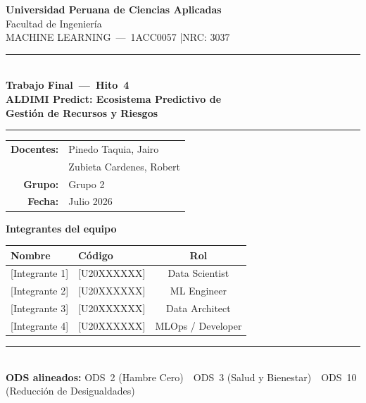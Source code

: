 \documentclass[12pt, a4paper]{article}
\begin{document}

\thispagestyle{empty}
\begin{center}
  \vspace*{1.2cm}
  {\LARGE\bfseries\color{primario} Universidad Peruana de Ciencias Aplicadas}\\[5pt]
  {\large\color{grismed} Facultad de Ingenier\'ia}\\[4pt]
  {\normalsize\color{grismed} MACHINE LEARNING\ ---\ 1ACC0057 \quad|\quad NRC: 3037}

  \vspace{0.8cm}
  \textcolor{primario}{\rule{\linewidth}{2.5pt}}\\[0.5cm]
  {\LARGE\bfseries\color{primario} Trabajo Final\ ---\ Hito~4}\\[0.4cm]
  {\large\bfseries\color{gristexto}
    ALDIMI Predict: Ecosistema Predictivo de\\[3pt]
    Gesti\'on de Recursos y Riesgos}\\[0.5cm]
  \textcolor{primario}{\rule{\linewidth}{2.5pt}}

  \vspace{1cm}
  \begin{tabular}{rl}
    \textbf{Docentes:} & Pinedo Taquia, Jairo \\[3pt]
                       & Zubieta Cardenes, Robert \\[8pt]
    \textbf{Grupo:}    & Grupo 2 \\[6pt]
    \textbf{Fecha:}    & Julio 2026 \\
  \end{tabular}

  \vspace{1.2cm}
  {\large\bfseries\color{primario} Integrantes del equipo}\\[8pt]
  \begin{tabular}{llc}
    \toprule
    \rowcolor{primario!15}
    \textbf{Nombre} & \textbf{C\'odigo} & \textbf{Rol} \\
    \midrule
    {[Integrante 1]} & {[U20XXXXXX]} & Data Scientist \\
    {[Integrante 2]} & {[U20XXXXXX]} & ML Engineer \\
    {[Integrante 3]} & {[U20XXXXXX]} & Data Architect \\
    {[Integrante 4]} & {[U20XXXXXX]} & MLOps / Developer \\
    \bottomrule
  \end{tabular}

  \vspace{1.5cm}
  \textcolor{secundario}{\rule{\linewidth}{0.8pt}}\\[5pt]
  {\small\color{grismed}
    \textbf{ODS alineados:}\quad
    ODS~2 (Hambre Cero)\ \textperiodcentered\
    ODS~3 (Salud y Bienestar)\ \textperiodcentered\
    ODS~10 (Reducci\'on de Desigualdades)
  }
\end{center}
\newpage
\end{document}

